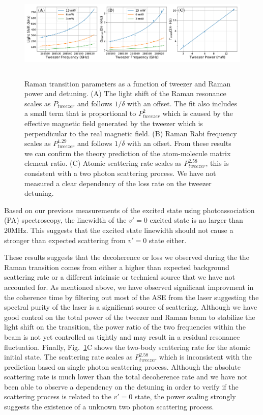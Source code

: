 \documentclass[aps,prl,twocolumn,groupedaddress]{revtex4-1}
\begin{document}
\begin{figure}
  \includegraphics[height=4.5cm]{fig4.pdf}
  \caption{Raman transition parameters as a function of tweezer and Raman power and detuning.
    (A) The light shift of the Raman resonance scales as $P_{tweezer}$
    and follows $1/\delta$ with an offset.
    The fit also includes a small term that is proportional to $P_{tweezer}^2$
    which is caused by the effective magnetic field generated by the tweezer which is
    perpendicular to the real magnetic field.
    (B) Raman Rabi frequency scales as $P_{tweezer}^{1.29}$ and follows $1/\delta$ with an offset.
    From these results we can confirm the theory prediction of
    the atom-molecule matrix element ratio.
    (C) Atomic scattering rate scales as $P_{tweezer}^{2.58}$,
    this is consistent with a two photon scattering process.
    We have not measured a clear dependency of the loss rate on the tweezer detuning.
    \label{f-det}}
\end{figure}

Based on our previous measurements of the excited state using photoassociation (PA) spectroscopy,
the linewidth of the $v'=0$ excited state is no larger than $20 \mathrm{MHz}$.
This suggests that the excited state linewidth should not cause a stronger than expected
scattering from $v'=0$ state either.

These results suggests that the decoherence or loss we observed during the the Raman transition
comes from either a higher than expected background scattering rate
or a different intrinsic or technical source that we have not accounted for.
As mentioned above, we have observed significant improvment in the coherence time
by filtering out most of the ASE from the laser suggesting the spectral purity of
the laser is a significant source of scattering.
Although we have good control on the total power of the tweezer and Raman beam to stabilize
the light shift on the transition, the power ratio of the two frequencies within the beam
is not yet controlled as tightly and may result in a residual resonance fluctuation.
Finally, Fig.~\ref{f-det}C shows the two-body scattering rate for the atomic initial state.
The scattering rate scales as $P_{tweezer}^{2.58}$ which is inconsistent with
the prediction based on single photon scattering process.
Although the absolute scattering rate is much lower than the total decoherence rate
and we have not been able to observe a dependency on the detuning in order to
verify if the scattering process is related to the $v'=0$ state, the power scaling
strongly suggests the existence of a unknown two photon scattering process.
\end{document}
